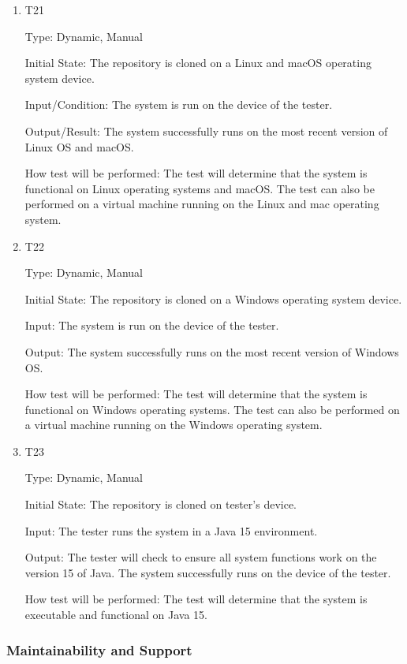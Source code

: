 \documentclass[12pt, titlepage]{article}
\begin{document}
\begin{enumerate}

\item{T21}

Type: Dynamic, Manual

Initial State: The repository is cloned on a Linux and macOS operating system device.

Input/Condition: The system is run on the device of the tester.

Output/Result: The system successfully runs on the most recent version of Linux OS and macOS.

How test will be performed: The test will determine that the system is functional on Linux operating systems and macOS. The test can also be performed on a virtual machine running on the Linux and mac operating system.

\item{T22}

Type: Dynamic, Manual

Initial State: The repository is cloned on a Windows operating system device.

Input: The system is run on the device of the tester.

Output: The system successfully runs on the most recent version of Windows OS.

How test will be performed: The test will determine that the system is functional on Windows operating systems. The test can also be performed on a virtual machine running on the Windows operating system.

\item{T23}

Type: Dynamic, Manual

Initial State: The repository is cloned on tester's device.

Input: The tester runs the system in a Java 15 environment.

Output: The tester will check to ensure all system functions work on the version 15 of Java. The system successfully runs on the device of the tester.

How test will be performed: The test will determine that the system is executable and functional on Java 15.

\end{enumerate}

\subsubsection{Maintainability and Support}
\end{document}
